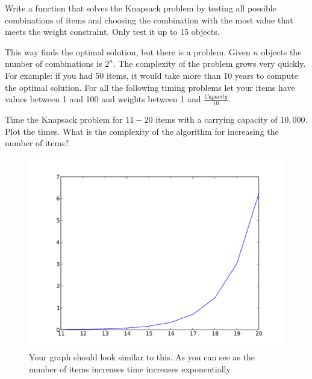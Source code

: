 \begin{problem}
Write a function that solves the Knapsack problem by testing all possible combinations of items and choosing the combination with the most value that meets the weight constraint.
Only test it up to 15 objects.
\end{problem}

This way finds the optimal solution, but there is a problem.
Given $n$ objects the number of combinations is $2^n$.
The complexity of the problem grows very quickly.
For example: if you had 50 items, it would take more than 10 years to compute the optimal solution.
For all the following timing problems let your items have values between 1 and 100 and weights between 1 and $\frac{Capacity}{10}$.

\begin{problem}
Time the Knapsack problem for $11-20$ items with a carrying capacity of $10,000$.
Plot the times.
What is the complexity of the algorithm for increasing the number of items?

\begin{figure}[H]
\includegraphics[width=\textwidth]{naiveTime.pdf}
\caption{
Your graph should look similar to this.
As you can see as the number of items increases time increases exponentially}
\end{figure}
\end{problem}

